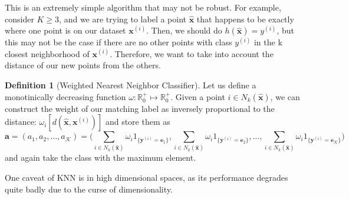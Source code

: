 \documentclass{article}
\theoremstyle{definition}
\newtheorem{definition}{Definition}[section]
\begin{document}
  This is an extremely simple algorithm that may not be robust. For example, consider $K \geq 3$, and we are trying to label a point $\hat{\mathbf{x}}$ that happens to be exactly where one point is on our dataset $\mathbf{x}^{(i)}$. Then, we should do $h(\hat{\mathbf{x}}) = y^{(i)}$, but this may not be the case if there are no other points with class $y^{(i)}$ in the k closest neighborhood of $\mathbf{x}^{(i)}$. Therefore, we want to take into account the distance of our new points from the others. 

  \begin{definition}[Weighted Nearest Neighbor Classifier]
  Let us define a monotinically decreasing function $\omega: \mathbb{R}_0^+ \mapsto \mathbb{R}_0^+$. Given a point $i \in N_k (\hat{\mathbf{x}})$, we can construct the weight of our matching label as inversely proportional to the distance: $\omega_i [ d(\hat{\mathbf{x}}, \mathbf{x}^{(i)})]$ and store them as 
  \[\mathbf{a} = (a_1, a_2, \ldots, a_\mathcal{K}) = \bigg( \sum_{i \in N_k (\hat{\mathbf{x}})} \omega_i 1_{\{\mathbf{y}^{(i)} = \mathbf{e}_1\}}, \sum_{i \in N_k (\hat{\mathbf{x}})} \omega_i 1_{\{\mathbf{y}^{(i)} = \mathbf{e}_2\}}, \ldots, \sum_{i \in N_k (\hat{\mathbf{x}})} \omega_i 1_{\{\mathbf{y}^{(i)} = \mathbf{e}_\mathcal{K}\}} \bigg)  \]
  and again take the class with the maximum element. 
  \end{definition}

  One caveat of KNN is in high dimensional spaces, as its performance degrades quite badly due to the curse of dimensionality. 
\end{document}
